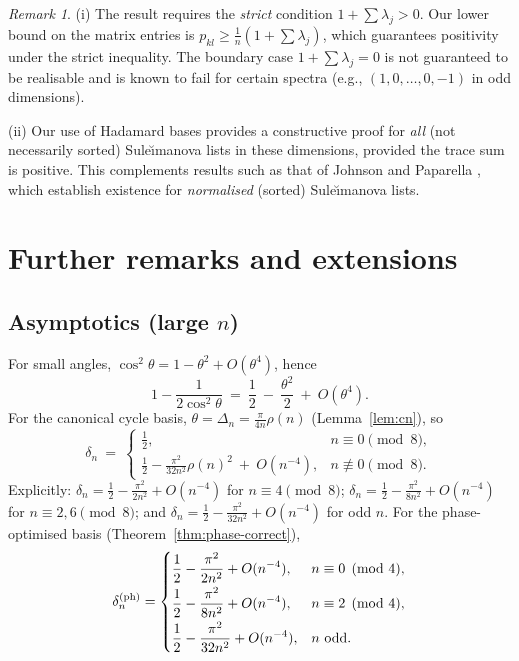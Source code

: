 \documentclass[12pt,fleqn]{amsart}
\renewcommand{\ge}{\geqslant}
\theoremstyle{remark}
\newtheorem{rem}[thm]{Remark}
\newcommand{\1}{\mathbf{1}}
\begin{document}
\begin{rem}
(i) The result requires the \emph{strict} condition $1+\sum\lambda_j>0$. Our lower bound on the matrix entries is $p_{kl}\ge \tfrac{1}{n}(1+\sum\lambda_j)$, which guarantees positivity under the strict inequality. The boundary case $1+\sum\lambda_j=0$ is not guaranteed to be realisable and is known to fail for certain spectra (e.g., $(1,0,\dots,0,-1)$ in odd dimensions).

(ii) Our use of Hadamard bases provides a constructive proof for \emph{all} (not necessarily sorted) Sule\u{\i}manova lists in these dimensions, provided the trace sum is positive. This complements results such as that of Johnson and Paparella \cite{JP16}, which establish existence for \emph{normalised} (sorted) Sule\u{\i}manova lists.
\end{rem}

\section{Further remarks and extensions}

\subsection*{Asymptotics (large \texorpdfstring{$n$}{n})}
For small angles, $\cos^2\theta=1-\theta^2+O(\theta^4)$, hence
\[
1-\frac{1}{2\cos^2\theta}\ =\ \frac12\ -\ \frac{\theta^2}{2}\ +\ O(\theta^4).
\]
For the canonical cycle basis, $\theta=\Delta_n=\frac{\pi}{4n}\rho(n)$ (Lemma~\ref{lem:cn}), so
\[
\delta_n\ =\
\begin{cases}
\displaystyle \frac12, & n\equiv 0\pmod{8},\\[1mm]
\displaystyle \frac12 - \frac{\pi^2}{32n^2}\rho(n)^2\ +\ O(n^{-4}), & n\not\equiv 0\pmod{8}.
\end{cases}
\]
Explicitly: $\delta_n=\frac12-\frac{\pi^2}{2n^2}+O(n^{-4})$ for $n\equiv 4\pmod{8}$; $\delta_n=\frac12-\frac{\pi^2}{8n^2}+O(n^{-4})$ for $n\equiv 2,6\pmod{8}$; and $\delta_n=\frac12-\frac{\pi^2}{32n^2}+O(n^{-4})$ for odd $n$. For the phase-optimised basis (Theorem~\ref{thm:phase-correct}),
\[
\delta_n^{\rm (ph)}=
\begin{cases}
\displaystyle \frac12-\frac{\pi^2}{2n^2}+O(n^{-4}),   & n\equiv 0\pmod{4},\\[2mm]
\displaystyle \frac12-\frac{\pi^2}{8n^2}+O(n^{-4}),  & n\equiv 2\pmod{4},\\[2mm]
\displaystyle \frac12-\frac{\pi^2}{32n^2}+O(n^{-4}), & n\ \text{odd}.
\end{cases}
\]
\end{document}
